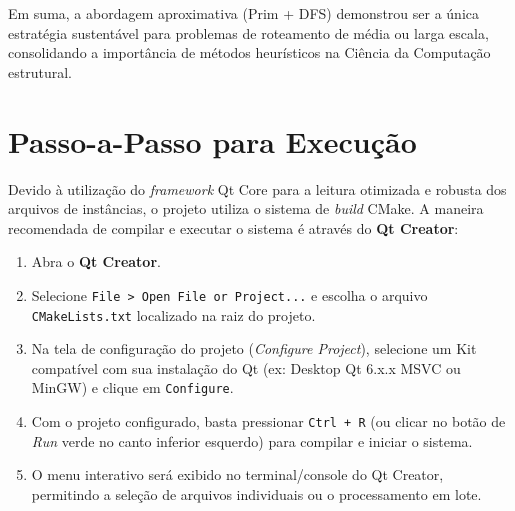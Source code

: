 \documentclass[12pt,a4paper]{article}
\begin{document}
Em suma, a abordagem aproximativa (Prim + DFS) demonstrou ser a única estratégia sustentável para problemas de roteamento de média ou larga escala, consolidando a importância de métodos heurísticos na Ciência da Computação estrutural.

\section{Passo-a-Passo para Execução}
Devido à utilização do \textit{framework} Qt Core para a leitura otimizada e robusta dos arquivos de instâncias, o projeto utiliza o sistema de \textit{build} CMake. A maneira recomendada de compilar e executar o sistema é através do \textbf{Qt Creator}:

\begin{enumerate}
    \item Abra o \textbf{Qt Creator}.
    \item Selecione \texttt{File > Open File or Project...} e escolha o arquivo \texttt{CMakeLists.txt} localizado na raiz do projeto.
    \item Na tela de configuração do projeto (\textit{Configure Project}), selecione um Kit compatível com sua instalação do Qt (ex: Desktop Qt 6.x.x MSVC ou MinGW) e clique em \texttt{Configure}.
    \item Com o projeto configurado, basta pressionar \texttt{Ctrl + R} (ou clicar no botão de \textit{Run} verde no canto inferior esquerdo) para compilar e iniciar o sistema.
    \item O menu interativo será exibido no terminal/console do Qt Creator, permitindo a seleção de arquivos individuais ou o processamento em lote.
\end{enumerate}
\end{document}
